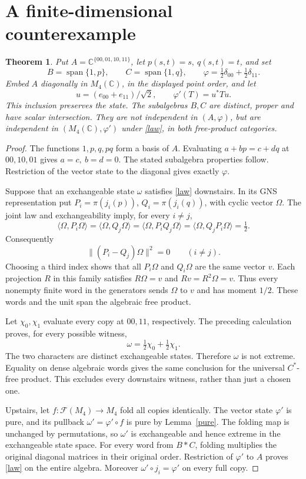 \documentclass[10pt]{article}
\newtheorem{theorem}{Theorem}
\newcommand{\C}{\mathbb C}
\newcommand{\F}{\mathcal F}
\begin{document}
\section{A finite-dimensional counterexample}
\begin{theorem}\label{main}
Put \(A=\C^{\{00,01,10,11\}}\), let \(p(s,t)=s,\ q(s,t)=t\), and set
\[
 B=\operatorname{span}\{1,p\},\qquad
 C=\operatorname{span}\{1,q\},\qquad
 \varphi=\tfrac12\delta_{00}+\tfrac12\delta_{11}.
\]
Embed \(A\) diagonally in \(M_4(\C)\), in the displayed point order, and let
\[
 u=(e_{00}+e_{11})/\sqrt2,\qquad \varphi'(T)=u^*Tu.
\]
This inclusion preserves the state. The subalgebras \(B,C\) are distinct,
proper and have scalar intersection. They are not independent in
\((A,\varphi)\), but are independent in \((M_4(\C),\varphi')\)
under \eqref{law}, in both free-product categories.
\end{theorem}

\begin{proof}
The functions \(1,p,q,pq\) form a basis of \(A\).
Evaluating \(a+bp=c+dq\) at \(00,10,01\) gives \(a=c,\ b=d=0\).
The stated subalgebra properties follow. Restriction of the vector
state to the diagonal gives exactly \(\varphi\).

Suppose that an exchangeable state \(\omega\) satisfies \eqref{law}
downstairs. In its GNS representation put \(P_i=\pi(j_i(p))\),
\(Q_i=\pi(j_i(q))\), with cyclic vector \(\Omega\).
The joint law and exchangeability imply, for every \(i\ne j\),
\[
 \langle\Omega,P_i\Omega\rangle
 =\langle\Omega,Q_j\Omega\rangle
 =\langle\Omega,P_iQ_j\Omega\rangle
 =\langle\Omega,Q_jP_i\Omega\rangle=\tfrac12 .
\]
Consequently
\[
 \|(P_i-Q_j)\Omega\|^2=0\qquad(i\ne j).
\]
Choosing a third index shows that all \(P_i\Omega\) and \(Q_i\Omega\)
are the same vector \(v\). Each projection \(R\) in this family satisfies
\(R\Omega=v\) and \(Rv=R^2\Omega=v\). Thus every nonempty finite word
in the generators sends \(\Omega\) to \(v\) and has moment \(1/2\).
These words and the unit span the algebraic free product.

Let \(\chi_0,\chi_1\) evaluate every copy at \(00,11\), respectively.
The preceding calculation proves, for every possible witness,
\[
                  \omega=\tfrac12\chi_0+\tfrac12\chi_1.
\]
The two characters are distinct exchangeable states. Therefore
\(\omega\) is not extreme. Equality on dense algebraic words gives
the same conclusion for the universal \(C^*\)-free product.
This excludes every downstairs witness, rather than just a chosen one.

Upstairs, let \(f:\F(M_4)\to M_4\) fold all copies identically.
The vector state \(\varphi'\) is pure, and its pullback
\(\omega'=\varphi'\circ f\) is pure by Lemma~\ref{pure}.
The folding map is unchanged by permutations, so \(\omega'\) is
exchangeable and hence extreme in the exchangeable state space.
For every word from \(B*C\), folding multiplies the original
diagonal matrices in their original order. Restriction of
\(\varphi'\) to \(A\) proves \eqref{law} on the entire algebra.
Moreover \(\omega'\circ j_i=\varphi'\) on every full copy.
\end{proof}
\end{document}
